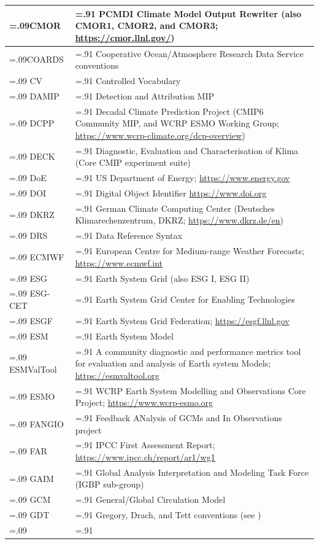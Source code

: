 \documentclass[gmd, preprint]{copernicus}
\begin{document}
\begin{table}[htp]
{\begin{tabularx}{1\textwidth} { 
	  | >{\raggedright\arraybackslash\hsize=.09\hsize}X
	  | >{\centering\arraybackslash\hsize=.91\hsize}X | }
CMOR & PCMDI Climate Model Output Rewriter (also CMOR1, CMOR2, and CMOR3; \url{https://cmor.llnl.gov/})\\ \hline
COARDS & Cooperative Ocean/Atmosphere Research Data Service conventions\\ \hline
CV & Controlled Vocabulary\\ \hline
DAMIP & Detection and Attribution MIP\\ \hline
DCPP & Decadal Climate Prediction Project (CMIP6 Community MIP, and WCRP ESMO Working Group; \url{https://www.wcrp-climate.org/dcp-overview})\\ \hline
DECK & Diagnostic, Evaluation and Characterisation of Klima (Core CMIP experiment suite)\\ \hline
DoE & US Department of Energy; \url{https://www.energy.gov}\\ \hline
DOI & Digital Object Identifier \url{https://www.doi.org}\\ \hline
DKRZ & German Climate Computing Center (Deutsches Klimarechenzentrum, DKRZ; \url{https://www.dkrz.de/en})\\ \hline
DRS & Data Reference Syntax\\ \hline
ECMWF & European Centre for Medium-range Weather Forecasts; \url{https://www.ecmwf.int}\\ \hline
ESG & Earth System Grid (also ESG I, ESG II)\\ \hline
ESG-CET & Earth System Grid Center for Enabling Technologies\\ \hline
ESGF & Earth System Grid Federation; \url{https://esgf.llnl.gov}\\ \hline
ESM & Earth System Model\\ \hline
ESMValTool & A community diagnostic and performance metrics tool for evaluation and analysis of Earth system Models; \url{https://esmvaltool.org}\\ \hline
ESMO & WCRP Earth System Modelling and Observations Core Project; \url{https://www.wcrp-esmo.org}\\ \hline
FANGIO & Feedback ANalysis of GCMs and In Observations project\\ \hline
FAR & IPCC First Assessment Report; \url{https://www.ipcc.ch/report/ar1/wg1}\\ \hline
GAIM & Global Analysis Interpretation and Modeling Task Force (IGBP sub-group)\\ \hline
GCM & General/Global Circulation Model\\ \hline
GDT & Gregory, Drach, and Tett conventions (see \cite{gregory_gdt_1999})\\ \hline
\multicolumn{2}{l}{\textbf{\autoref{tab:tabAppE1-Acronyms} continued overpage..}}\\
\end{tabularx}
} %
\label{tab:tabAppE1-Acronyms}
\end{table}
\end{document}
